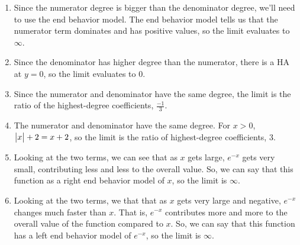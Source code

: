 \begin{answer}
	\begin{enumerate}
		\item Since the numerator degree is bigger than the denominator degree, we'll need to use the end behavior model.
			The end behavior model tells us that the numerator term dominates and has positive values, so the limit evaluates to $\infty$.
		\item Since the denominator has higher degree than the numerator, there is a HA at $y=0$, so the limit evaluates to $0$.
		\item Since the numerator and denominator have the same degree, the limit is the ratio of the highest-degree coefficients, $\frac{-1}{3}$.
		\item The numerator and denominator have the same degree. For $x > 0$, $\big\lvert x \big\rvert+2 = x+2$, so the limit is the ratio of highest-degree coefficients, $3$.
		\item Looking at the two terms, we can see that as $x$ gets large, $e^{-x}$ gets very small, contributing less and less to the overall value.
			So, we can say that this function as a right end behavior model of $x$, so the limit is $\infty$.
		\item Looking at the two terms, we that that as $x$ gets very large and negative, $e^{-x}$ changes much faster than $x$.
			That is, $e^{-x}$ contributes more and more to the overall value of the function compared to $x$.
			So, we can say that this function has a left end behavior model of $e^{-x}$, so the limit is $\infty$.
	\end{enumerate}
\end{answer}